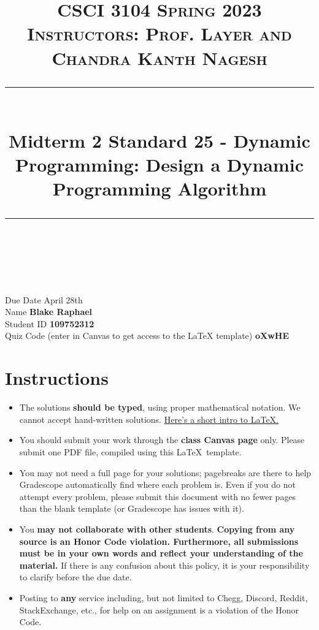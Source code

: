 \documentclass[11pt]{article}
\title{
\normalfont \normalsize 
\textsc{CSCI 3104 Spring 2023 \\
Instructors: Prof. Layer and Chandra Kanth Nagesh} \\
[10pt] 
\rule{\linewidth}{0.5pt} \\[6pt] 
\huge Midterm 2 Standard 25 - Dynamic Programming: Design a Dynamic Programming Algorithm
\rule{\linewidth}{2pt}  \\[10pt]
}
\date{}
\theoremstyle{definition}
\theoremstyle{definition}
\theoremstyle{definition}
\begin{document}
\maketitle


\noindent
Due Date \dotfill April 28th \\
Name \dotfill \textbf{Blake Raphael} \\
Student ID \dotfill \textbf{109752312} \\
Quiz Code (enter in Canvas to get access to the LaTeX template) \dotfill \textbf{ oXwHE } \\

\tableofcontents

\section{Instructions}
 \begin{itemize}
	\item The solutions \textbf{should be typed}, using proper mathematical notation. We cannot accept hand-written solutions. \href{http://ece.uprm.edu/~caceros/latex/introduction.pdf}{Here's a short intro to \LaTeX.}
	\item You should submit your work through the \textbf{class Canvas page} only. Please submit one PDF file, compiled using this \LaTeX \ template.
	\item You may not need a full page for your solutions; pagebreaks are there to help Gradescope automatically find where each problem is. Even if you do not attempt every problem, please submit this document with no fewer pages than the blank template (or Gradescope has issues with it).

	\item You \textbf{may not collaborate with other students}. \textbf{Copying from any source is an Honor Code violation. Furthermore, all submissions must be in your own words and reflect your understanding of the material.} If there is any confusion about this policy, it is your responsibility to clarify before the due date. 

	\item Posting to \textbf{any} service including, but not limited to Chegg, Discord, Reddit, StackExchange, etc., for help on an assignment is a violation of the Honor Code.

	\end{itemize}
\newpage
\end{document}
